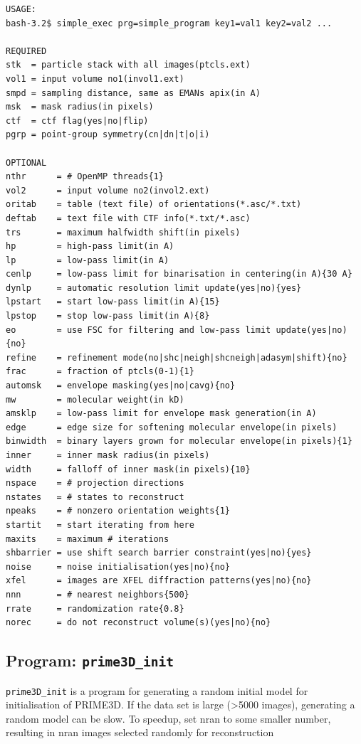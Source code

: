 \documentclass[a4paper,11pt]{article}
\newcommand{\prgname}[1]{\textcolor{NavyBlue}{\texttt{#1}}}
\begin{document}
\begin{verbatim}
USAGE:
bash-3.2$ simple_exec prg=simple_program key1=val1 key2=val2 ...

REQUIRED
stk  = particle stack with all images(ptcls.ext)
vol1 = input volume no1(invol1.ext)
smpd = sampling distance, same as EMANs apix(in A)
msk  = mask radius(in pixels)
ctf  = ctf flag(yes|no|flip)
pgrp = point-group symmetry(cn|dn|t|o|i)

OPTIONAL
nthr      = # OpenMP threads{1}
vol2      = input volume no2(invol2.ext)
oritab    = table (text file) of orientations(*.asc/*.txt)
deftab    = text file with CTF info(*.txt/*.asc)
trs       = maximum halfwidth shift(in pixels)
hp        = high-pass limit(in A)
lp        = low-pass limit(in A)
cenlp     = low-pass limit for binarisation in centering(in A){30 A}
dynlp     = automatic resolution limit update(yes|no){yes}
lpstart   = start low-pass limit(in A){15}
lpstop    = stop low-pass limit(in A){8}
eo        = use FSC for filtering and low-pass limit update(yes|no){no}
refine    = refinement mode(no|shc|neigh|shcneigh|adasym|shift){no}
frac      = fraction of ptcls(0-1){1}
automsk   = envelope masking(yes|no|cavg){no}
mw        = molecular weight(in kD)
amsklp    = low-pass limit for envelope mask generation(in A)
edge      = edge size for softening molecular envelope(in pixels)
binwidth  = binary layers grown for molecular envelope(in pixels){1}
inner     = inner mask radius(in pixels)
width     = falloff of inner mask(in pixels){10}
nspace    = # projection directions
nstates   = # states to reconstruct
npeaks    = # nonzero orientation weights{1}
startit   = start iterating from here
maxits    = maximum # iterations
shbarrier = use shift search barrier constraint(yes|no){yes}
noise     = noise initialisation(yes|no){no}
xfel      = images are XFEL diffraction patterns(yes|no){no}
nnn       = # nearest neighbors{500}
rrate     = randomization rate{0.8}
norec     = do not reconstruct volume(s)(yes|no){no}
\end{verbatim}

\subsection{Program: \prgname{prime3D\_init}}
\label{prime3D_init}
\prgname{prime3D\_init} is a program for generating a random initial model for initialisation of PRIME3D. If the data set is large (>5000 images), generating a random model can be slow. To speedup, set nran to some smaller number, resulting in nran images selected randomly for reconstruction
\end{document}
